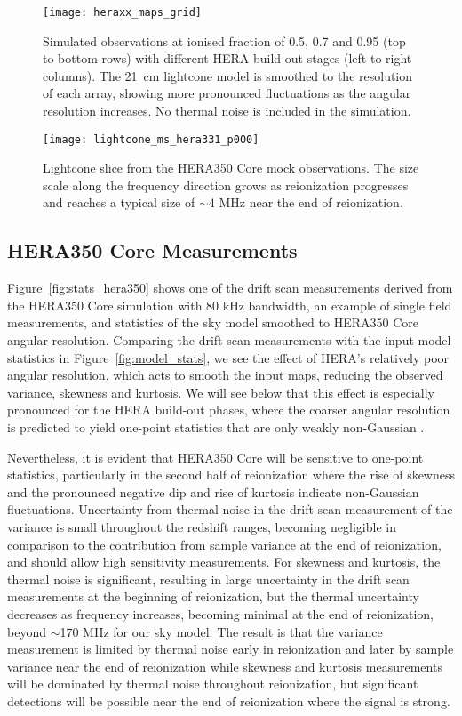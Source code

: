 \documentclass[fleqn,usenatbib]{mnras}
\begin{document}
\begin{figure*}
    \texttt{[image: heraxx\_maps\_grid]}
    \caption{Simulated observations at ionised fraction of 0.5, 0.7 and 0.95 (top to bottom rows) with different HERA build-out stages (left to right columns). The 21~cm lightcone model is smoothed to the resolution of each array, showing more pronounced fluctuations as the angular resolution increases. No thermal noise is included in the simulation.}
    \label{fig:maps}
\end{figure*}
\begin{figure*}
    \texttt{[image: lightcone\_ms\_hera331\_p000]}
    \caption{Lightcone slice from the HERA350 Core mock observations. The size scale along the frequency direction grows as reionization progresses and reaches a typical size of $\sim4$ MHz near the end of reionization.}
    \label{fig:lightcone}
\end{figure*}

\subsection{HERA350 Core Measurements}
\label{sec:hera350_stats}
Figure~\ref{fig:stats_hera350} shows one of the drift scan measurements derived from the HERA350 Core simulation with 80 kHz bandwidth, an example of single field measurements, and statistics of the sky model smoothed to HERA350 Core angular resolution. Comparing the drift scan measurements with the input model statistics in Figure~\ref{fig:model_stats}, we see the effect of HERA's relatively poor angular resolution, which acts to smooth the input maps, reducing the observed variance, skewness and kurtosis. We will see below that this effect is especially pronounced for the HERA build-out phases, where the coarser angular resolution is predicted to yield one-point statistics that are only weakly non-Gaussian \citep{2015MNRAS.449L..41M}. 

Nevertheless, it is evident that HERA350 Core will be sensitive to one-point statistics, particularly in the second half of reionization where the rise of skewness and the pronounced negative dip and rise of kurtosis indicate non-Gaussian fluctuations. Uncertainty from thermal noise in the drift scan measurement of the variance is small throughout the redshift ranges, becoming negligible in comparison to the contribution from sample variance at the end of reionization, and should allow high sensitivity measurements. For skewness and kurtosis, the thermal noise is significant, resulting in large uncertainty in the drift scan measurements at the beginning of reionization, but the thermal uncertainty decreases as frequency increases, becoming minimal at the end of reionization, beyond $\sim$170 MHz for our sky model. The result is that the variance measurement is limited by thermal noise early in reionization and later by sample variance near the end of reionization while skewness and kurtosis measurements will be dominated by thermal noise throughout reionization, but significant detections will be possible near the end of reionization where the signal is strong.
\end{document}
